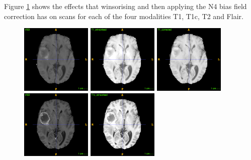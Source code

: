 \documentclass[12pt,a4paper,twoside,openright]{report}
\begin{document}
Figure \ref{fig:n4itk_example} shows the effects that winsorising and then applying the N4 bias field correction has on scans for each of the four modalities T1, T1c, T2 and Flair.
\begin{figure}
	\centering
	\label{fig:n4itk_example}
	\includegraphics[width=0.3\textwidth]{t1_no_norm_example}
	\includegraphics[width=0.3\textwidth]{t1_winsorized_example}
	\includegraphics[width=0.3\textwidth]{t1_n4itk_example} \\
	\vspace{0.5cm}
	\includegraphics[width=0.3\textwidth]{t1c_no_norm_example}
	\includegraphics[width=0.3\textwidth]{t1c_winsorized_example}

\end{figure}
\end{document}
